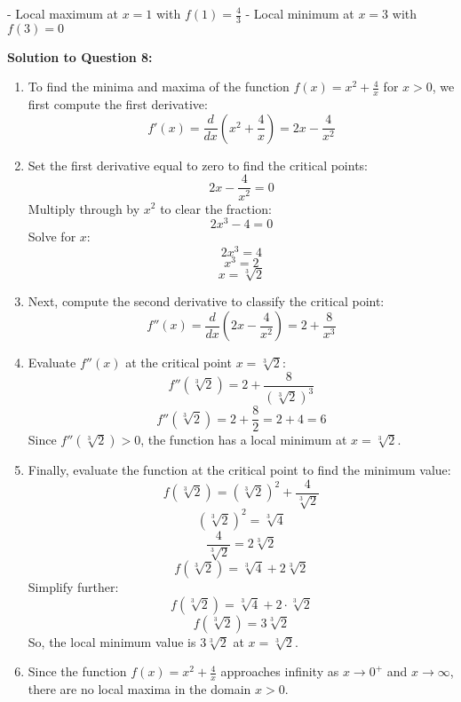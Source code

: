 \documentclass{article}
\begin{document}
- Local maximum at \( x = 1 \) with \( f(1) = \frac{4}{3} \)
- Local minimum at \( x = 3 \) with \( f(3) = 0 \)
    \item \textbf{Solution to Question 8:}
\begin{enumerate}[label=(\alph*), itemsep=10pt]
    \item To find the minima and maxima of the function \( f(x) = x^2 + \frac{4}{x} \) for \( x > 0 \), we first compute the first derivative:
    \[
    f'(x) = \frac{d}{dx}\left(x^2 + \frac{4}{x}\right) = 2x - \frac{4}{x^2}
    \]

    \item Set the first derivative equal to zero to find the critical points:
    \[
    2x - \frac{4}{x^2} = 0
    \]
    Multiply through by \( x^2 \) to clear the fraction:
    \[
    2x^3 - 4 = 0
    \]
    Solve for \( x \):
    \[
    2x^3 = 4
    \]
    \[
    x^3 = 2
    \]
    \[
    x = \sqrt[3]{2}
    \]

    \item Next, compute the second derivative to classify the critical point:
    \[
    f''(x) = \frac{d}{dx}\left(2x - \frac{4}{x^2}\right) = 2 + \frac{8}{x^3}
    \]

    \item Evaluate \( f''(x) \) at the critical point \( x = \sqrt[3]{2} \):
    \[
    f''\left(\sqrt[3]{2}\right) = 2 + \frac{8}{\left(\sqrt[3]{2}\right)^3}
    \]
    \[
    f''\left(\sqrt[3]{2}\right) = 2 + \frac{8}{2} = 2 + 4 = 6
    \]
    Since \( f''\left(\sqrt[3]{2}\right) > 0 \), the function has a local minimum at \( x = \sqrt[3]{2} \).

    \item Finally, evaluate the function at the critical point to find the minimum value:
    \[
    f\left(\sqrt[3]{2}\right) = \left(\sqrt[3]{2}\right)^2 + \frac{4}{\sqrt[3]{2}}
    \]
    \[
    \left(\sqrt[3]{2}\right)^2 = \sqrt[3]{4}
    \]
    \[
    \frac{4}{\sqrt[3]{2}} = 2 \sqrt[3]{2}
    \]
    \[
    f\left(\sqrt[3]{2}\right) = \sqrt[3]{4} + 2 \sqrt[3]{2}
    \]
    Simplify further:
    \[
    f\left(\sqrt[3]{2}\right) = \sqrt[3]{4} + 2 \cdot \sqrt[3]{2}
    \]
    \[
    f\left(\sqrt[3]{2}\right) = 3 \sqrt[3]{2}
    \]
    So, the local minimum value is \( 3 \sqrt[3]{2} \) at \( x = \sqrt[3]{2} \).

    \item Since the function \( f(x) = x^2 + \frac{4}{x} \) approaches infinity as \( x \to 0^+ \) and \( x \to \infty \), there are no local maxima in the domain \( x > 0 \).
\end{enumerate}
\end{document}
